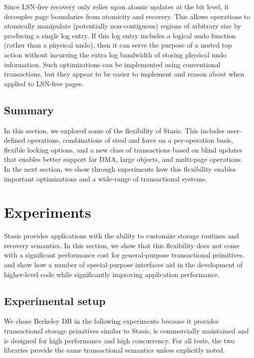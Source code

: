 \documentclass[letterpaper,twocolumn,10pt]{article}
\newcommand{\yad}{Stasis\xspace}
\begin{document}
Since LSN-free recovery only relies upon atomic updates at the bit
level, it decouples page boundaries from atomicity and recovery.  This
allows operations to atomically manipulate (potentially
non-contiguous) regions of arbitrary size by producing a single log
entry.  If this log entry includes a logical undo function (rather
than a physical undo), then it can serve the purpose of a nested top
action without incurring the extra log bandwidth of storing physical
undo information.  Such optimizations can be implemented using
conventional transactions, but they appear to be easier to implement
and reason about when applied to LSN-free pages.

\subsection{Summary}

In this section, we explored some of the flexibility of \yad. This
includes user-defined operations, combinations of steal and force on
a per-operation basis, flexible locking options, and a new class of
transactions based on blind updates that enables better support for
DMA, large objects, and multi-page operations.  In the next section,
we show through experiments how this flexibility enables important
optimizations and a wide-range of transactional systems.




\section{Experiments}
\label{experiments}

\yad provides applications with the ability to customize storage
routines and recovery semantics.  In this section, we show that this
flexibility does not come with a significant performance cost for
general-purpose transactional primitives, and show how a number of
special-purpose interfaces aid in the development of higher-level 
code while significantly improving application performance.

\subsection{Experimental setup}
\label{sec:experimental_setup}

We chose Berkeley DB in the following experiments because
it provides transactional storage primitives
similar to \yad, is 
commercially maintained and is designed for high performance and high
concurrency.  For all tests, the two libraries provide the same
transactional semantics unless explicitly noted.
\end{document}
